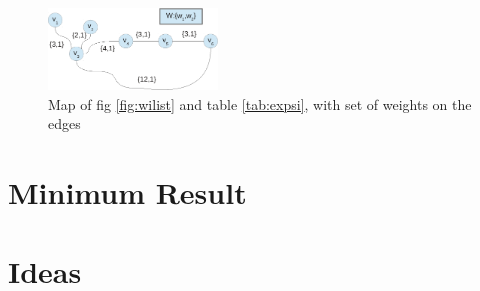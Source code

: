 \begin{figure}[hbt]
  \center
        \includegraphics[width=0.4\textwidth]{figures/map1}
        \caption{Map of fig \ref{fig:wilist} and table \ref{tab:expsi}, with set of weights on the edges}
  \label{fig:map1}
\end{figure}


% 
% 

\section{Minimum Result}








\section{Ideas}


